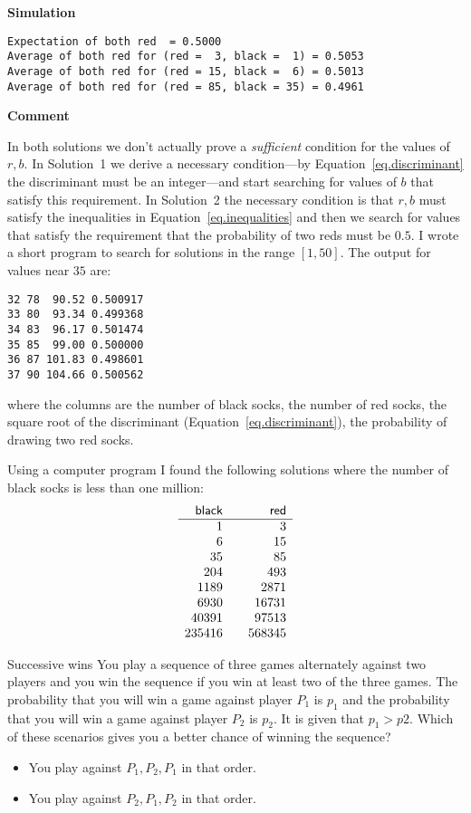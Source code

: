\medskip
\textbf{Simulation}
\begin{verbatim}
Expectation of both red  = 0.5000
Average of both red for (red =  3, black =  1) = 0.5053
Average of both red for (red = 15, black =  6) = 0.5013
Average of both red for (red = 85, black = 35) = 0.4961
\end{verbatim}

\textbf{Comment}

In both solutions we don't actually prove a \emph{sufficient} condition for the values of $r,b$. In Solution~1 we derive a necessary condition---by Equation~\ref{eq.discriminant} the discriminant must be an integer---and start searching for values of $b$ that satisfy this requirement. In Solution~2 the necessary condition is that $r,b$ must satisfy the inequalities in Equation~\ref{eq.inequalities} and then we search for values that satisfy the requirement that the probability of two reds must be $0.5$. I wrote a short program to search for solutions in the range $[1,50]$. The output for values near $35$ are:
\begin{verbatim}
32 78  90.52 0.500917
33 80  93.34 0.499368
34 83  96.17 0.501474
35 85  99.00 0.500000
36 87 101.83 0.498601
37 90 104.66 0.500562
\end{verbatim}
where the columns are the number of black socks, the number of red socks, the square root of the discriminant (Equation~\ref{eq.discriminant}), the probability of drawing two red socks.

Using a computer program I found the following solutions where the number of black socks is less than one million:
\[
\begin{array}{r@{\hspace{2em}}r}
\textsf{black} & \textsf{red}\\\hline
1 & 3 \\
6 & 15\\
35 &  85\\
204 &  493\\
1189 &  2871\\
6930 & 16731\\
40391 &  97513\\
235416 & 568345
\end{array}
\]


\begin{prob}{Successive wins}
You play a sequence of three games alternately against two players and you win the sequence if you win at least two of the three games. The probability that you will win a game against player $P_1$ is $p_1$ and the probability that you will win a game against player $P_2$ is $p_2$. It is given that $p_1>p2$. Which of these scenarios gives you a better chance of winning the sequence?
\begin{itemize}
\item You play against $P_1,P_2,P_1$ in that order.
\item You play against $P_2,P_1,P_2$ in that order.
\end{itemize}
\end{prob}

